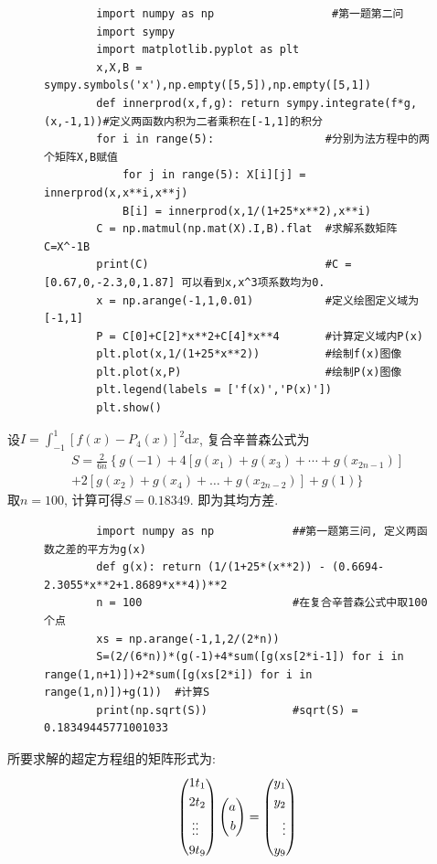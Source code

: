 \documentclass[UTF8,9pt]{ctexart}
\begin{document}
\begin{figure}[htbp]
	\begin{lstlisting}
		import numpy as np                  #第一题第二问
		import sympy
		import matplotlib.pyplot as plt
		x,X,B = sympy.symbols('x'),np.empty([5,5]),np.empty([5,1])
		def innerprod(x,f,g): return sympy.integrate(f*g,(x,-1,1))#定义两函数内积为二者乘积在[-1,1]的积分
		for i in range(5):                 #分别为法方程中的两个矩阵X,B赋值
			for j in range(5): X[i][j] = innerprod(x,x**i,x**j) 
			B[i] = innerprod(x,1/(1+25*x**2),x**i)
		C = np.matmul(np.mat(X).I,B).flat  #求解系数矩阵C=X^-1B
		print(C)                           #C = [0.67,0,-2.3,0,1.87] 可以看到x,x^3项系数均为0.
		x = np.arange(-1,1,0.01)           #定义绘图定义域为[-1,1]
		P = C[0]+C[2]*x**2+C[4]*x**4       #计算定义域内P(x)
		plt.plot(x,1/(1+25*x**2))          #绘制f(x)图像
		plt.plot(x,P)                      #绘制P(x)图像
		plt.legend(labels = ['f(x)','P(x)'])
		plt.show()
	\end{lstlisting}
\end{figure}
	设$I=\int_{-1}^{1}\left[f(x)-P_{4}(x)\right]^{2} \mathrm{d} x$, 复合辛普森公式为$$ 
\begin{array}{c}{S= \frac{2}{6 n}\left\{g(-1)+4\left[g\left(x_{1}\right)+g\left(x_{3}\right)+\cdots+g\left(x_{2 n-1}\right)\right]\right.} \\ {+2\left[g\left(x_{2}\right)+g\left(x_{4}\right)+\dots+g\left(x_{2 n-2}\right)\right]+g(1) \}}\end{array}
 $$
取$n=100$, 计算可得$S = 0.18349$. 即为其均方差. 
\begin{figure}[htbp]
	\begin{lstlisting}
		import numpy as np            ##第一题第三问, 定义两函数之差的平方为g(x)
		def g(x): return (1/(1+25*(x**2)) - (0.6694-2.3055*x**2+1.8689*x**4))**2  
		n = 100                       #在复合辛普森公式中取100个点
		xs = np.arange(-1,1,2/(2*n))
		S=(2/(6*n))*(g(-1)+4*sum([g(xs[2*i-1]) for i in range(1,n+1)])+2*sum([g(xs[2*i]) for i in range(1,n)])+g(1))  #计算S 
		print(np.sqrt(S))             #sqrt(S) = 0.18349445771001033
	\end{lstlisting}
\end{figure}
所要求解的超定方程组的矩阵形式为:
$$\left(\begin{aligned} 1&t_1\\2&t_2\\\vdots&\vdots\\9&t_9 \end{aligned}\right)\left(\begin{aligned} a\\b \end{aligned}\right) = \left(\begin{aligned} y_1\\y_2\\\vdots\\y_9 \end{aligned}\right)$$
\end{document}

